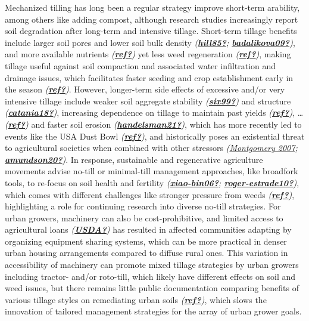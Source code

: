\documentclass[
]{article}
\begin{document}
Mechanized tilling has long been a regular strategy improve short-term arability, among others like adding compost, although research studies increasingly report soil degradation after long-term and intensive tillage.
Short-term tillage benefits include larger soil pores and lower soil bulk density \emph{(\protect\hyperlink{ref-hill85}{\textbf{hill85?}}; \protect\hyperlink{ref-badalikova09}{\textbf{badalikova09?}})}, and more available nutrients \emph{(\protect\hyperlink{ref-ref}{\textbf{ref?}})} yet less weed regeneration \emph{(\protect\hyperlink{ref-ref}{\textbf{ref?}})}, making tillage useful against soil compaction and associated water infiltration and drainage issues, which facilitates faster seeding and crop establishment early in the season \emph{(\protect\hyperlink{ref-ref}{\textbf{ref?}})}.
However, longer-term side effects of excessive and/or very intensive tillage include weaker soil aggregate stability \emph{(\protect\hyperlink{ref-six99}{\textbf{six99?}})} and structure \emph{(\protect\hyperlink{ref-catania18}{\textbf{catania18?}})}, increasing dependence on tillage to maintain past yields \emph{(\protect\hyperlink{ref-ref}{\textbf{ref?}})}, \ldots{}\emph{(\protect\hyperlink{ref-ref}{\textbf{ref?}})} and faster soil erosion \emph{(\protect\hyperlink{ref-handelsman21}{\textbf{handelsman21?}})}, which has more recently led to events like the USA Dust Bowl \emph{(\protect\hyperlink{ref-ref}{\textbf{ref?}})}, and historically poses an existential threat to agricultural societies when combined with other stressors \emph{(\protect\hyperlink{ref-montgomery07}{Montgomery 2007}; \protect\hyperlink{ref-amundson20}{\textbf{amundson20?}})}.
In response, sustainable and regenerative agriculture movements advise no-till or minimal-till management approaches, like broadfork tools, to re-focus on soil health and fertility \emph{(\protect\hyperlink{ref-xiao-bin06}{\textbf{xiao-bin06?}}; \protect\hyperlink{ref-roger-estrade10}{\textbf{roger-estrade10?}})}, which comes with different challenges like stronger pressure from weeds \emph{(\protect\hyperlink{ref-ref}{\textbf{ref?}})}, highlighting a role for continuing research into diverse no-till strategies.
For urban growers, machinery can also be cost-prohibitive, and limited access to agricultural loans \emph{(\protect\hyperlink{ref-USDA}{\textbf{USDA?}})} has resulted in affected communities adapting by organizing equipment sharing systems, which can be more practical in denser urban housing arrangements compared to diffuse rural ones.
This variation in accessibility of machinery can promote mixed tillage strategies by urban growers including tractor- and/or roto-till, which likely have different effects on soil and weed issues, but there remains little public documentation comparing benefits of various tillage styles on remediating urban soils \emph{(\protect\hyperlink{ref-ref}{\textbf{ref?}})}, which slows the innovation of tailored management strategies for the array of urban grower goals.
\end{document}
